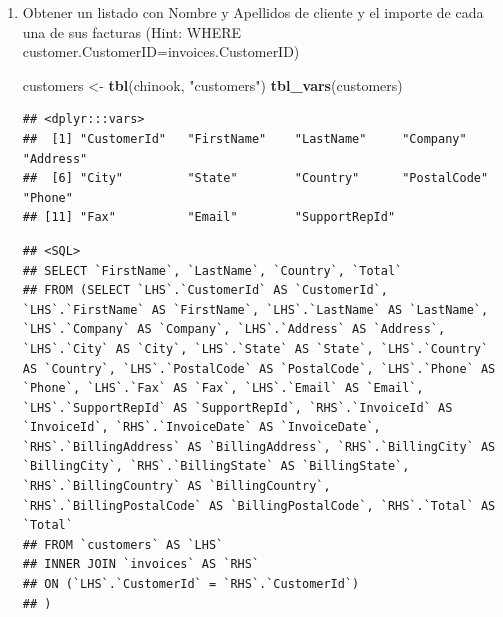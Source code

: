 \documentclass[]{book}
\newenvironment{Shaded}{\begin{snugshade}}{\end{snugshade}}
\newcommand{\KeywordTok}[1]{\textcolor[rgb]{0.13,0.29,0.53}{\textbf{#1}}}
\newcommand{\DataTypeTok}[1]{\textcolor[rgb]{0.13,0.29,0.53}{#1}}
\newcommand{\StringTok}[1]{\textcolor[rgb]{0.31,0.60,0.02}{#1}}
\newcommand{\OperatorTok}[1]{\textcolor[rgb]{0.81,0.36,0.00}{\textbf{#1}}}
\newcommand{\NormalTok}[1]{#1}
\begin{document}
\begin{enumerate}
\def\labelenumi{\arabic{enumi}.}
\setcounter{enumi}{3}
\item
  Obtener un listado con Nombre y Apellidos de cliente y el importe de
  cada una de sus facturas (Hint: WHERE
  customer.CustomerID=invoices.CustomerID)

\begin{Shaded}
\begin{Highlighting}[]
\NormalTok{customers <-}\StringTok{ }\KeywordTok{tbl}\NormalTok{(chinook, }\StringTok{"customers"}\NormalTok{)}
\KeywordTok{tbl_vars}\NormalTok{(customers) }
\end{Highlighting}
\end{Shaded}

\begin{verbatim}
## <dplyr:::vars>
##  [1] "CustomerId"   "FirstName"    "LastName"     "Company"      "Address"     
##  [6] "City"         "State"        "Country"      "PostalCode"   "Phone"       
## [11] "Fax"          "Email"        "SupportRepId"
\end{verbatim}

\begin{Shaded}
\end{Shaded}

\begin{verbatim}
## <SQL>
## SELECT `FirstName`, `LastName`, `Country`, `Total`
## FROM (SELECT `LHS`.`CustomerId` AS `CustomerId`, `LHS`.`FirstName` AS `FirstName`, `LHS`.`LastName` AS `LastName`, `LHS`.`Company` AS `Company`, `LHS`.`Address` AS `Address`, `LHS`.`City` AS `City`, `LHS`.`State` AS `State`, `LHS`.`Country` AS `Country`, `LHS`.`PostalCode` AS `PostalCode`, `LHS`.`Phone` AS `Phone`, `LHS`.`Fax` AS `Fax`, `LHS`.`Email` AS `Email`, `LHS`.`SupportRepId` AS `SupportRepId`, `RHS`.`InvoiceId` AS `InvoiceId`, `RHS`.`InvoiceDate` AS `InvoiceDate`, `RHS`.`BillingAddress` AS `BillingAddress`, `RHS`.`BillingCity` AS `BillingCity`, `RHS`.`BillingState` AS `BillingState`, `RHS`.`BillingCountry` AS `BillingCountry`, `RHS`.`BillingPostalCode` AS `BillingPostalCode`, `RHS`.`Total` AS `Total`
## FROM `customers` AS `LHS`
## INNER JOIN `invoices` AS `RHS`
## ON (`LHS`.`CustomerId` = `RHS`.`CustomerId`)
## )
\end{verbatim}


\end{enumerate}
\end{document}
